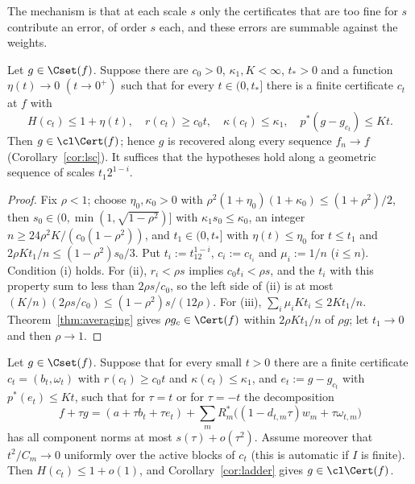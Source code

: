 The mechanism is that at each scale $s$ only the certificates that are too
fine for $s$ contribute an error, of order $s$ each, and these errors are
summable against the weights.

\begin{corollary}\label{cor:ladder}
Let $g\in\Cset(f)$.  Suppose there are $c_0>0$, $\kappa_1,K<\infty$, $t_*>0$
and a function $\eta(t)\to0$ $(t\to0^+)$ such that for every $t\in(0,t_*]$
there is a finite certificate $c_t$ at $f$ with
\[
 H(c_t)\le1+\eta(t),\quad r(c_t)\ge c_0t,\quad \kappa(c_t)\le\kappa_1,\quad
 p^*(g-g_{c_t})\le Kt.
\]
Then $g\in\cl\Cert(f)$; hence $g$ is recovered along every sequence
$f_n\to f$ \textup{(}Corollary~\ref{cor:lsc}\textup{)}.  It suffices that
the hypotheses hold along a geometric sequence of scales $t_1 2^{1-i}$.
\end{corollary}

\begin{proof}
Fix $\rho<1$; choose $\eta_0,\kappa_0>0$ with
$\rho^2(1+\eta_0)(1+\kappa_0)\le(1+\rho^2)/2$, then
$s_0\in(0,\min(1,\sqrt{1-\rho^2})]$ with $\kappa_1s_0\le\kappa_0$, an integer
$n\ge24\rho^2K/(c_0(1-\rho^2))$, and $t_1\in(0,t_*]$ with $\eta(t)\le\eta_0$
for $t\le t_1$ and $2\rho Kt_1/n\le(1-\rho^2)s_0/3$.  Put $t_i:=t_12^{1-i}$,
$c_i:=c_{t_i}$ and $\mu_i:=1/n$ ($i\le n$).  Condition (i) holds.  For (ii),
$r_i<\rho s$ implies $c_0t_i<\rho s$, and the $t_i$ with this property sum
to less than $2\rho s/c_0$, so the left side of (ii) is at most
$(K/n)(2\rho s/c_0)\le(1-\rho^2)s/(12\rho)$.  For (iii),
$\sum_i\mu_iKt_i\le2Kt_1/n$.  Theorem~\ref{thm:averaging} gives $\rho
g_{c}\in\Cert(f)$ within $2\rho Kt_1/n$ of $\rho g$; let $t_1\to0$ and then
$\rho\to1$.
\end{proof}

\begin{corollary}\label{cor:decomposition}
Let $g\in\Cset(f)$.  Suppose that for every small $t>0$ there are a finite
certificate $c_t=(b_t,\omega_t)$ with $r(c_t)\ge c_0t$ and
$\kappa(c_t)\le\kappa_1$, and $e_t:=g-g_{c_t}$ with $p^*(e_t)\le Kt$, such
that for $\tau=t$ or for $\tau=-t$ the decomposition
\[
 f+\tau g=(a+\tau b_t+\tau e_t)+\sum_mR_m^*\big((1-d_{t,m}\tau)w_m+\tau
 \omega_{t,m}\big)
\]
has all component norms at most $s(\tau)+o(\tau^2)$.  Assume moreover that
$t^2/C_m\to0$ uniformly over the active blocks of $c_t$ \textup{(}this is
automatic if $I$ is finite\textup{)}.  Then $H(c_t)\le1+o(1)$, and
Corollary~\ref{cor:ladder} gives $g\in\cl\Cert(f)$.
\end{corollary}

